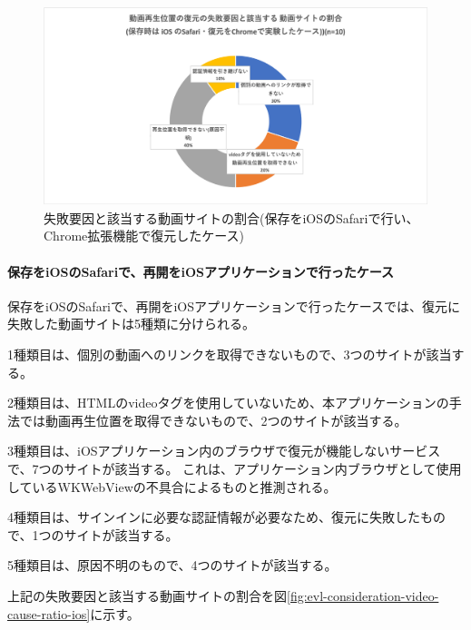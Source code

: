 \begin{figure}[htbp]
  \label{fig:evl-consideration-video-cause-ratio-ios-chrome}
  \begin{center}
    \includegraphics[bb=0 0 701.55555556 361.55555556,width=15cm]{img/060_evaluation/consideration/video/cause-ratio-ios-chrome.pdf}
  \end{center}
  \caption{失敗要因と該当する動画サイトの割合(保存をiOSのSafariで行い、Chrome拡張機能で復元したケース)}
\end{figure}

\paragraph{保存をiOSのSafariで、再開をiOSアプリケーションで行ったケース}
保存をiOSのSafariで、再開をiOSアプリケーションで行ったケースでは、復元に失敗した動画サイトは5種類に分けられる。

1種類目は、個別の動画へのリンクを取得できないもので、3つのサイトが該当する。

2種類目は、HTMLのvideoタグを使用していないため、本アプリケーションの手法では動画再生位置を取得できないもので、2つのサイトが該当する。

3種類目は、iOSアプリケーション内のブラウザで復元が機能しないサービスで、7つのサイトが該当する。
これは、アプリケーション内ブラウザとして使用しているWKWebViewの不具合によるものと推測される。

4種類目は、サインインに必要な認証情報が必要なため、復元に失敗したもので、1つのサイトが該当する。

5種類目は、原因不明のもので、4つのサイトが該当する。

上記の失敗要因と該当する動画サイトの割合を図\ref{fig:evl-consideration-video-cause-ratio-ios}に示す。


